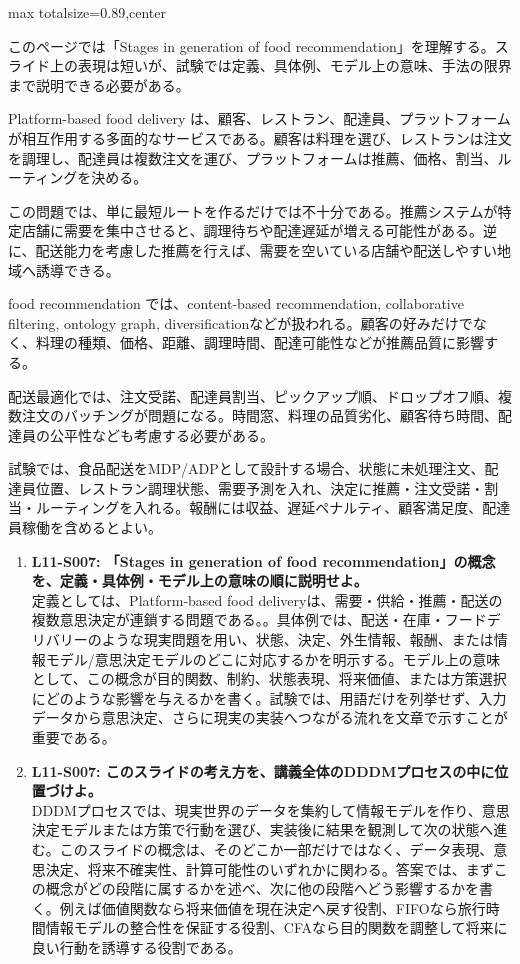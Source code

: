 \begin{minipage}[t]{0.58\textwidth}
\begin{adjustbox}{max totalsize={\textwidth}{0.89\textheight},center}
\begin{minipage}{\textwidth}\scriptsize
{}このページでは「Stages in generation of food recommendation」を理解する。スライド上の表現は短いが、試験では定義、具体例、モデル上の意味、手法の限界まで説明できる必要がある。\par
Platform-based food delivery は、顧客、レストラン、配達員、プラットフォームが相互作用する多面的なサービスである。顧客は料理を選び、レストランは注文を調理し、配達員は複数注文を運び、プラットフォームは推薦、価格、割当、ルーティングを決める。\par
この問題では、単に最短ルートを作るだけでは不十分である。推薦システムが特定店舗に需要を集中させると、調理待ちや配達遅延が増える可能性がある。逆に、配送能力を考慮した推薦を行えば、需要を空いている店舗や配送しやすい地域へ誘導できる。\par
food recommendation では、content-based recommendation, collaborative filtering, ontology graph, diversificationなどが扱われる。顧客の好みだけでなく、料理の種類、価格、距離、調理時間、配達可能性などが推薦品質に影響する。\par
配送最適化では、注文受諾、配達員割当、ピックアップ順、ドロップオフ順、複数注文のバッチングが問題になる。時間窓、料理の品質劣化、顧客待ち時間、配達員の公平性なども考慮する必要がある。\par
試験では、食品配送をMDP/ADPとして設計する場合、状態に未処理注文、配達員位置、レストラン調理状態、需要予測を入れ、決定に推薦・注文受諾・割当・ルーティングを入れる。報酬には収益、遅延ペナルティ、顧客満足度、配達員稼働を含めるとよい。\par{}\begin{enumerate}\item \textbf{L11-S007: 「Stages in generation of food recommendation」の概念を、定義・具体例・モデル上の意味の順に説明せよ。}\\定義としては、Platform-based food deliveryは、需要・供給・推薦・配送の複数意思決定が連鎖する問題である。。具体例では、配送・在庫・フードデリバリーのような現実問題を用い、状態、決定、外生情報、報酬、または情報モデル/意思決定モデルのどこに対応するかを明示する。モデル上の意味として、この概念が目的関数、制約、状態表現、将来価値、または方策選択にどのような影響を与えるかを書く。試験では、用語だけを列挙せず、入力データから意思決定、さらに現実の実装へつながる流れを文章で示すことが重要である。\item \textbf{L11-S007: このスライドの考え方を、講義全体のDDDMプロセスの中に位置づけよ。}\\DDDMプロセスでは、現実世界のデータを集約して情報モデルを作り、意思決定モデルまたは方策で行動を選び、実装後に結果を観測して次の状態へ進む。このスライドの概念は、そのどこか一部だけではなく、データ表現、意思決定、将来不確実性、計算可能性のいずれかに関わる。答案では、まずこの概念がどの段階に属するかを述べ、次に他の段階へどう影響するかを書く。例えば価値関数なら将来価値を現在決定へ戻す役割、FIFOなら旅行時間情報モデルの整合性を保証する役割、CFAなら目的関数を調整して将来に良い行動を誘導する役割である。\end{enumerate}

\end{minipage}
\end{adjustbox}
\end{minipage}
